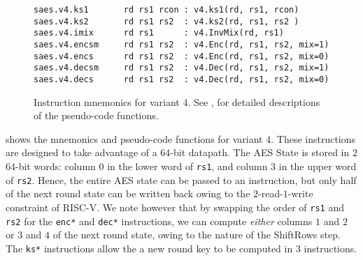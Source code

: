 
\begin{figure}
\begin{lstlisting}[language=pseudo,style=block]
saes.v4.ks1       rd rs1 rcon : v4.ks1(rd, rs1, rcon)
saes.v4.ks2       rd rs1 rs2  : v4.ks2(rd, rs1, rs2 )
saes.v4.imix      rd rs1      : v4.InvMix(rd, rs1)
saes.v4.encsm     rd rs1 rs2  : v4.Enc(rd, rs1, rs2, mix=1)
saes.v4.encs      rd rs1 rs2  : v4.Enc(rd, rs1, rs2, mix=0)
saes.v4.decsm     rd rs1 rs2  : v4.Dec(rd, rs1, rs2, mix=1)
saes.v4.decs      rd rs1 rs2  : v4.Dec(rd, rs1, rs2, mix=0)
\end{lstlisting}
\caption{
    Instruction mnemonics for variant 4.
    See ,  for detailed
    descriptions of the pseudo-code functions.
}
\label{fig:mnemonics:v4}
\end{figure}

 shows the mnemonics and pseudo-code functions
for variant 4.
These instructions are designed to take advantage of a 64-bit
datapath.
The AES State is stored in $2$ $64$-bit words: column $0$ in the
lower word of {\tt rs1}, and column $3$ in the upper word of {\tt rs2}.
Hence, the entire AES state can be passed to an instruction, but only
half of the next round state can be written back owing to the
$2$-read-$1$-write constraint of RISC-V.
We note however that by swapping the order of {\tt rs1} and {\tt rs2}
for the {\tt enc*} and {\tt dec*} instructions, we can compute {\em either}
columns $1$ and $2$ or $3$ and $4$ of the next round state, owing to
the nature of the ShiftRows step.
The {\tt ks*} instructions allow the a new round key to be computed
in $3$ instructions.

